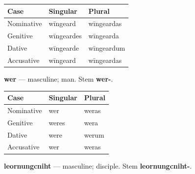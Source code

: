 \par\begingroup
\fontsize{10.5}{13.2}\selectfont
\setlength{\LTleft}{0pt}\setlength{\LTright}{\fill}
\noindent
\begin{tabular}{@{}>{\raggedright\arraybackslash}p{39.46mm}>{\raggedright\arraybackslash}p{39.46mm}>{\raggedright\arraybackslash}p{39.46mm}@{}}
\toprule
\textbf{Case} & \textbf{Singular} & \textbf{Plural} \\
\midrule
Nominative & wīngeard & wīngeardas \\
Genitive & wīngeardes & wīngearda \\
Dative & wīngearde & wīngeardum \\
Accusative & wīngeard & wīngeardas \\
\bottomrule
\end{tabular}
\par\endgroup

\textbf{wer} — masculine; man. Stem \textbf{wer-}.

\par\begingroup
\fontsize{10.5}{13.2}\selectfont
\setlength{\LTleft}{0pt}\setlength{\LTright}{\fill}
\noindent
\begin{tabular}{@{}>{\raggedright\arraybackslash}p{39.46mm}>{\raggedright\arraybackslash}p{39.46mm}>{\raggedright\arraybackslash}p{39.46mm}@{}}
\toprule
\textbf{Case} & \textbf{Singular} & \textbf{Plural} \\
\midrule
Nominative & wer & weras \\
Genitive & weres & wera \\
Dative & were & werum \\
Accusative & wer & weras \\
\bottomrule
\end{tabular}
\par\endgroup

\textbf{leornungcniht} — masculine; disciple. Stem \textbf{leornungcniht-}.

